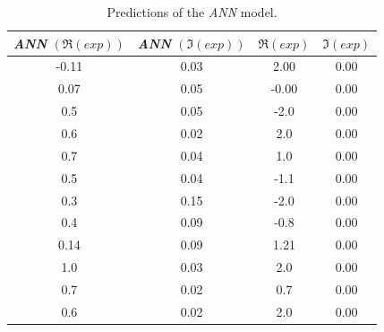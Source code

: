 \begin{table}[htbp]
  \centering
  \begin{tabular}{@{}cccc@{}}
  \toprule 
  \emph{ANN} $(\Re(exp))$ &
  \emph{ANN} $(\Im(exp))$ &
  $\Re(exp)$ &
  $\Im(exp)$ \\
  \midrule
  -0.11 & 0.03 & 2.00  & 0.00 \\
  0.07  & 0.05 & -0.00 & 0.00 \\
  0.5   & 0.05 & -2.0  & 0.00 \\
  0.6   & 0.02 & 2.0   & 0.00 \\
  0.7   & 0.04 & 1.0   & 0.00 \\
  0.5   & 0.04 & -1.1  & 0.00 \\
  0.3   & 0.15 & -2.0  & 0.00 \\
  0.4   & 0.09 & -0.8  & 0.00 \\
  0.14  & 0.09 & 1.21  & 0.00 \\
  1.0   & 0.03 & 2.0   & 0.00 \\
  0.7   & 0.02 & 0.7   & 0.00 \\
  0.6   & 0.02 & 2.0   & 0.00 \\
  \bottomrule
  \end{tabular}%
  \caption{Predictions of the \emph{ANN} model.}
  \label{tab:agg:ann_comp}
\end{table}
